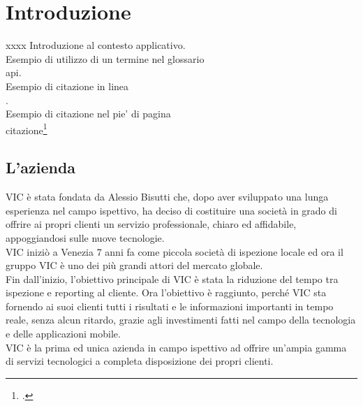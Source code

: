 
\chapter{Introduzione}
\label{cap:introduzione}
xxxx
Introduzione al contesto applicativo.\\

\noindent Esempio di utilizzo di un termine nel glossario \\
\gls{api}. \\

\noindent Esempio di citazione in linea \\
\cite{site:agile-manifesto}. \\

\noindent Esempio di citazione nel pie' di pagina \\
citazione\footcite{womak:lean-thinking} \\

\section{L'azienda}

VIC è stata fondata da Alessio Bisutti che, dopo aver sviluppato una lunga esperienza nel campo ispettivo, ha deciso di costituire una società in grado di offrire ai propri clienti un servizio professionale, chiaro ed affidabile, appoggiandosi sulle nuove tecnologie.\\
VIC iniziò a Venezia 7 anni fa come piccola società di ispezione locale ed ora il gruppo VIC è uno dei più grandi attori del mercato globale.\\
Fin dall'inizio, l'obiettivo principale di VIC è stata la riduzione del tempo tra ispezione e reporting al cliente. Ora l'obiettivo è raggiunto, perché VIC sta fornendo ai suoi clienti tutti i risultati e le informazioni importanti in tempo reale, senza alcun ritardo, grazie agli investimenti fatti nel campo della tecnologia e delle applicazioni mobile.\\
VIC è la prima ed unica azienda in campo ispettivo ad offrire un'ampia gamma di servizi tecnologici a completa disposizione dei propri clienti. 

